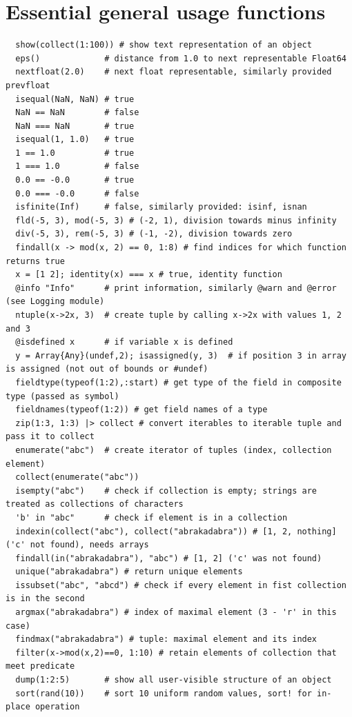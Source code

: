 \documentclass[10pt,a4paper]{article}
\begin{document}
\section{Essential general usage functions}
\begin{lstlisting}
  show(collect(1:100)) # show text representation of an object
  eps()             # distance from 1.0 to next representable Float64
  nextfloat(2.0)    # next float representable, similarly provided prevfloat
  isequal(NaN, NaN) # true
  NaN == NaN        # false
  NaN === NaN       # true
  isequal(1, 1.0)   # true
  1 == 1.0          # true
  1 === 1.0         # false
  0.0 == -0.0       # true
  0.0 === -0.0      # false
  isfinite(Inf)     # false, similarly provided: isinf, isnan
  fld(-5, 3), mod(-5, 3) # (-2, 1), division towards minus infinity
  div(-5, 3), rem(-5, 3) # (-1, -2), division towards zero
  findall(x -> mod(x, 2) == 0, 1:8) # find indices for which function returns true
  x = [1 2]; identity(x) === x # true, identity function
  @info "Info"      # print information, similarly @warn and @error (see Logging module)
  ntuple(x->2x, 3)  # create tuple by calling x->2x with values 1, 2 and 3
  @isdefined x      # if variable x is defined
  y = Array{Any}(undef,2); isassigned(y, 3)  # if position 3 in array is assigned (not out of bounds or #undef)
  fieldtype(typeof(1:2),:start) # get type of the field in composite type (passed as symbol)
  fieldnames(typeof(1:2)) # get field names of a type
  zip(1:3, 1:3) |> collect # convert iterables to iterable tuple and pass it to collect
  enumerate("abc")  # create iterator of tuples (index, collection element)
  collect(enumerate("abc"))
  isempty("abc")    # check if collection is empty; strings are treated as collections of characters
  'b' in "abc"      # check if element is in a collection
  indexin(collect("abc"), collect("abrakadabra")) # [1, 2, nothing] ('c' not found), needs arrays
  findall(in("abrakadabra"), "abc") # [1, 2] ('c' was not found)
  unique("abrakadabra") # return unique elements
  issubset("abc", "abcd") # check if every element in fist collection is in the second
  argmax("abrakadabra") # index of maximal element (3 - 'r' in this case)
  findmax("abrakadabra") # tuple: maximal element and its index
  filter(x->mod(x,2)==0, 1:10) # retain elements of collection that meet predicate
  dump(1:2:5)       # show all user-visible structure of an object
  sort(rand(10))    # sort 10 uniform random values, sort! for in-place operation
\end{lstlisting}
\end{document}
